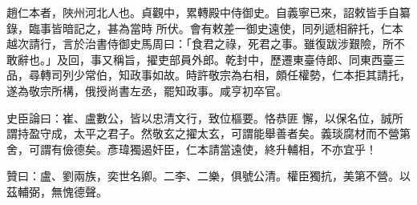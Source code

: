 \begin{pinyinscope}
 趙仁本者，陜州河北人也。貞觀中，累轉殿中侍御史。自義寧已來，詔敕皆手自纂錄，臨事皆暗記之，甚為當時
 所伏。會有敕差一御史遠使，同列遞相辭托，仁本越次請行，言於治書侍御史馬周曰：「食君之祿，死君之事。雖復跋涉艱險，所不敢辭也。」及回，事又稱旨，擢吏部員外郎。乾封中，歷遷東臺侍郎、同東西臺三品，尋轉司列少常伯，知政事如故。時許敬宗為右相，頗任權勢，仁本拒其請托，遂為敬宗所構，俄授尚書左丞，罷知政事。咸亨初卒官。



 史臣論曰：崔、盧數公，皆以忠清文行，致位樞要。恪恭匪
 懈，以保名位，誠所謂持盈守成，太平之君子。然敬玄之擢太玄，可謂能舉善者矣。義琰腐材而不營第舍，可謂有儉德矣。彥瑋獨遏奸臣，仁本請當遠使，終升輔相，不亦宜乎！



 贊曰：盧、劉兩族，奕世名卿。二李、二樂，俱號公清。權臣獨抗，美第不營。以茲輔弼，無愧德聲。



\end{pinyinscope}